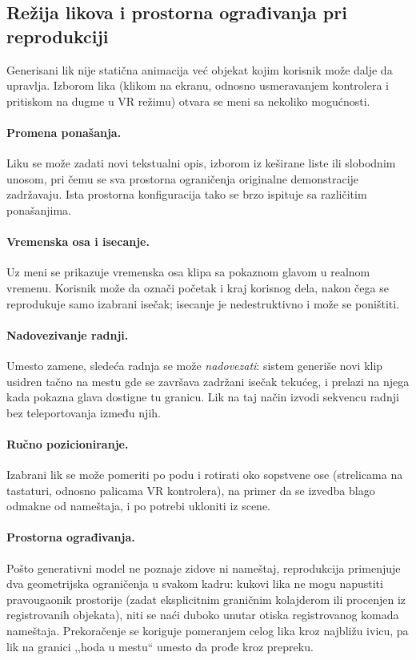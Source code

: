 \documentclass{article}
\begin{document}
\subsection{Režija likova i prostorna ograđivanja pri reprodukciji}
\label{sec:direction}

Generisani lik nije statična animacija već objekat kojim korisnik može dalje da upravlja. Izborom lika (klikom na ekranu, odnosno usmeravanjem kontrolera i pritiskom na dugme u VR režimu) otvara se meni sa nekoliko mogućnosti.

\paragraph{Promena ponašanja.} Liku se može zadati novi tekstualni opis, izborom iz keširane liste ili slobodnim unosom, pri čemu se sva prostorna ograničenja originalne demonstracije zadržavaju. Ista prostorna konfiguracija tako se brzo ispituje sa različitim ponašanjima.

\paragraph{Vremenska osa i isecanje.} Uz meni se prikazuje vremenska osa klipa sa pokaznom glavom u realnom vremenu. Korisnik može da označi početak i kraj korisnog dela, nakon čega se reprodukuje samo izabrani isečak; isecanje je nedestruktivno i može se poništiti.

\paragraph{Nadovezivanje radnji.} Umesto zamene, sledeća radnja se može \emph{nadovezati}: sistem generiše novi klip usidren tačno na mestu gde se završava zadržani isečak tekućeg, i prelazi na njega kada pokazna glava dostigne tu granicu. Lik na taj način izvodi sekvencu radnji bez teleportovanja između njih.

\paragraph{Ručno pozicioniranje.} Izabrani lik se može pomeriti po podu i rotirati oko sopstvene ose (strelicama na tastaturi, odnosno palicama VR kontrolera), na primer da se izvedba blago odmakne od nameštaja, i po potrebi ukloniti iz scene.

\paragraph{Prostorna ograđivanja.} Pošto generativni model ne poznaje zidove ni nameštaj, reprodukcija primenjuje dva geometrijska ograničenja u svakom kadru: kukovi lika ne mogu napustiti pravougaonik prostorije (zadat eksplicitnim graničnim kolajderom ili procenjen iz registrovanih objekata), niti se naći duboko unutar otiska registrovanog komada nameštaja. Prekoračenje se koriguje pomeranjem celog lika kroz najbližu ivicu, pa lik na granici ,,hoda u mestu`` umesto da prođe kroz prepreku.
\end{document}
